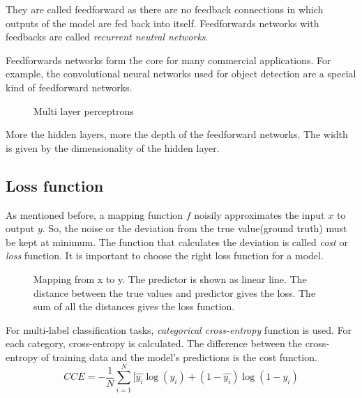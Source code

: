They are called feedforward as there are no feedback connections in which outputs of the
model are fed back into itself. Feedforwards networks with feedbacks are called
\textit{recurrent neutral networks}.

Feedforwards networks form the core for many commercial applications. For example, the
convolutional neural networks used for object detection are a special kind of feedforward
networks.
\begin{figure}[h]
    \def\svgwidth{0.5\textwidth}
	\begin{center}
    \end{center}
    \caption{Multi layer perceptrons}
    \label{fig:MLP}
\end{figure}

More the hidden layers, more the depth of the feedforward networks. The width is given by
the dimensionality of the hidden layer.

\subsection{Loss function}
\label{subsec:lossfunction}
As mentioned before, a mapping function $f$ noisily approximates the input $x$ to output
$y$. So, the noise or the deviation from the true value(ground truth) must be kept at
minimum. The function that calculates the deviation is called \textit{cost} or
\textit{loss} function. It is important to choose the right loss function for a model.

\begin{figure}[h]
	\centering
    \def\svgwidth{0.5\textwidth}
    \caption{Mapping from x to y. The predictor is shown as linear line. The distance
    between the true values and predictor gives the loss. The sum of all the distances
gives the loss function.}
\label{fig:loss function}
\end{figure}

For multi-label classification tasks, \textit{categorical cross-entropy} function is used.
For each category, cross-entropy is calculated. The difference between the cross-entropy
of training data and the model's predictions is the cost function.
\begin{equation}
  CCE = -\frac{1}{N}\sum_{i = 1}^N [\hat{y_{i}}\log(y_{i})  + (1- \hat{y_{i}})\log(1-y_{i})
   \label{eq:CCE}
\end{equation}

